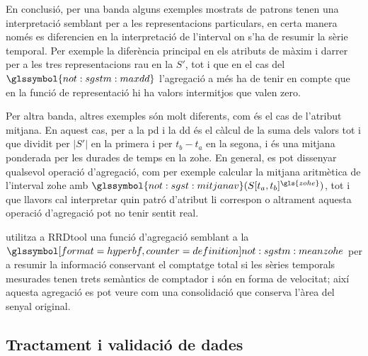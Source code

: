 En conclusió, per una banda alguns exemples mostrats de patrons tenen
una interpretació semblant per a les representacions particulars, en
certa manera només es diferencien en la interpretació de l'interval on
s'ha de resumir la sèrie temporal. Per exemple la diferència principal
en els atributs de màxim i darrer per a les tres representacions rau
en la $S'$, tot i que en el cas del $\glssymbol{not:sgstm:maxdd}$
l'agregació a més ha de tenir en compte que en la funció de
representació hi ha valors intermitjos que valen zero.

Per altra banda, altres exemples són molt diferents, com és el cas de
l'atribut mitjana. En aquest cas, per a la \gls{pd} i la \gls{dd} és
el càlcul de la suma dels valors tot i que dividit per $|S'|$ en la
primera i per $t_b-t_a$ en la segona, i és una mitjana ponderada per
les durades de temps en la \gls{zohe}.  En general, es pot dissenyar
qualsevol operació d'agregació, com per exemple calcular la mitjana
aritmètica de l'interval \gls{zohe} amb
$\glssymbol{not:sgst:mitjanav}(S[t_a,t_b]^{\gls{zohe}})$, tot i que
llavors cal interpretar quin patró d'atribut li correspon o altrament
aquesta operació d'agregació pot no tenir sentit real.


\textcite{rrdtool} utilitza a RRDtool una funció d'agregació semblant
a la $\glssymboldef{not:sgstm:meanzohe}$ per a resumir la informació
conservant el comptatge total si les sèries temporals mesurades tenen
trets semàntics de comptador i són en forma de velocitat; així aquesta
agregació es pot veure com una consolidació que conserva l'àrea del
senyal original. 










\subsection{Tractament i validació de dades}


